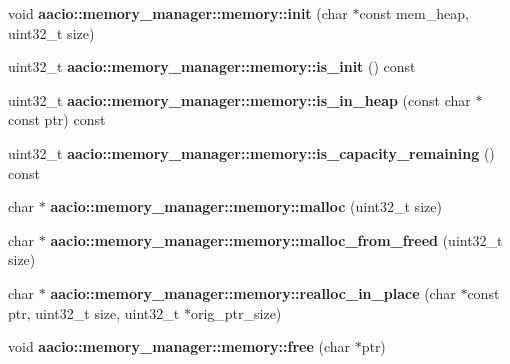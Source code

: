 \begin{DoxyCompactItemize}
\item 
\mbox{\label{group__memorycppapi_ga21291be94a7362e5c35206d4c934dedd}} 
void {\bfseries aacio\+::memory\+\_\+manager\+::memory\+::init} (char $\ast$const mem\+\_\+heap, uint32\+\_\+t size)
\item 
\mbox{\label{group__memorycppapi_ga709a7e36cb485168fd5d5ba7a1f4b451}} 
uint32\+\_\+t {\bfseries aacio\+::memory\+\_\+manager\+::memory\+::is\+\_\+init} () const
\item 
\mbox{\label{group__memorycppapi_ga1a74e955d36a0355182a2f699721eb8f}} 
uint32\+\_\+t {\bfseries aacio\+::memory\+\_\+manager\+::memory\+::is\+\_\+in\+\_\+heap} (const char $\ast$const ptr) const
\item 
\mbox{\label{group__memorycppapi_ga93d9e62b5685f1993a9774629e24d4f5}} 
uint32\+\_\+t {\bfseries aacio\+::memory\+\_\+manager\+::memory\+::is\+\_\+capacity\+\_\+remaining} () const
\item 
\mbox{\label{group__memorycppapi_ga2cc4270ee286ca4e522e5c66644b75e6}} 
char $\ast$ {\bfseries aacio\+::memory\+\_\+manager\+::memory\+::malloc} (uint32\+\_\+t size)
\item 
\mbox{\label{group__memorycppapi_ga11d5b97c61e09181ca76320c8d60a4f7}} 
char $\ast$ {\bfseries aacio\+::memory\+\_\+manager\+::memory\+::malloc\+\_\+from\+\_\+freed} (uint32\+\_\+t size)
\item 
\mbox{\label{group__memorycppapi_ga9933dc90b0000fe1f7210a2f6d501cf2}} 
char $\ast$ {\bfseries aacio\+::memory\+\_\+manager\+::memory\+::realloc\+\_\+in\+\_\+place} (char $\ast$const ptr, uint32\+\_\+t size, uint32\+\_\+t $\ast$orig\+\_\+ptr\+\_\+size)
\item 
\mbox{\label{group__memorycppapi_ga959fdb5dfd5698cadfa0e2c81e8e788e}} 
void {\bfseries aacio\+::memory\+\_\+manager\+::memory\+::free} (char $\ast$ptr)
\item 
\mbox{\label{group__memorycppapi_gab5d3dcbfeed89d0e22c2c23591c8241b}} 

\end{DoxyCompactItemize}
